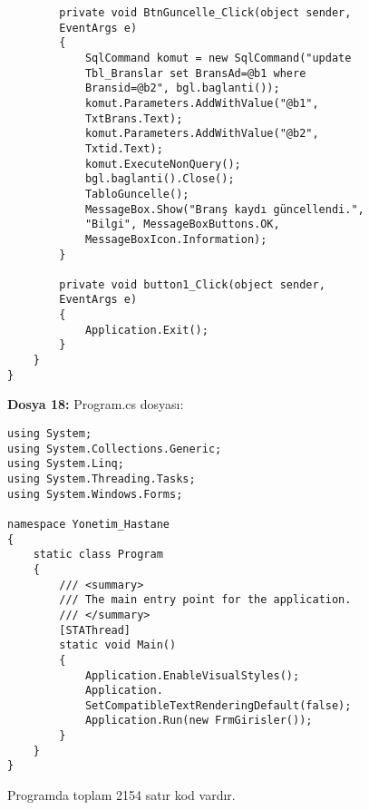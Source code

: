 \begin{lstlisting}
        private void BtnGuncelle_Click(object sender, 
        EventArgs e)
        {
            SqlCommand komut = new SqlCommand("update 
            Tbl_Branslar set BransAd=@b1 where 
            Bransid=@b2", bgl.baglanti());
            komut.Parameters.AddWithValue("@b1", 
            TxtBrans.Text);
            komut.Parameters.AddWithValue("@b2", 
            Txtid.Text);
            komut.ExecuteNonQuery();
            bgl.baglanti().Close();
            TabloGuncelle();
            MessageBox.Show("Branş kaydı güncellendi.", 
            "Bilgi", MessageBoxButtons.OK, 
            MessageBoxIcon.Information);
        }

        private void button1_Click(object sender, 
        EventArgs e)
        {
            Application.Exit();
        }
    }
}
\end{lstlisting}

\textbf{Dosya 18:} Program.cs dosyası:

\begin{lstlisting}
using System;
using System.Collections.Generic;
using System.Linq;
using System.Threading.Tasks;
using System.Windows.Forms;

namespace Yonetim_Hastane
{
    static class Program
    {
        /// <summary>
        /// The main entry point for the application.
        /// </summary>
        [STAThread]
        static void Main()
        {
            Application.EnableVisualStyles();
            Application.
            SetCompatibleTextRenderingDefault(false);
            Application.Run(new FrmGirisler());
        }
    }
}
\end{lstlisting}

Programda toplam 2154 satır kod vardır.